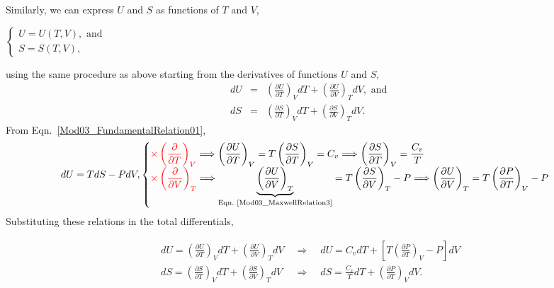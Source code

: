 \documentclass[12pts,a4paper,amsmath,amssymb,floatfix]{article}%
\newcommand{\frc}{\displaystyle\frac}
\newcommand{\red}{\textcolor{red}}
\newcommand{\Partial}[3][error]{\left(\frc{\partial #1}{\partial #2}\right)_{#3}}
\begin{document}
Similarly, we can express $U$ and $S$ as functions of $T$ and $V$,
    \begin{center}
       $\begin{cases}
           U = U(T,V), \text{ and } \\
           S = S(T,V),
        \end{cases}$
    \end{center} 
using the same procedure as above starting from the derivatives of functions $U$ and $S$,
    \begin{eqnarray}
        dU &=& \Partial[U]{T}{V}dT + \Partial[U]{V}{T}dV, \text{ and } \nonumber \\
        dS &=& \Partial[S]{T}{V}dT + \Partial[S]{V}{T}dV. \nonumber
    \end{eqnarray} 
From Eqn.~\ref{Mod03_FundamentalRelation01}, 
    \begin{displaymath}
        dU = TdS - PdV,
        \begin{cases}
            \red{\times\Partial[]{T}{V}} \Longrightarrow \Partial[U]{T}{V} = T\Partial[S]{T}{V} = C_{v} \Longrightarrow  \Partial[S]{T}{V} = \frc{C_{v}}{T}\\
            \red{\times\Partial[]{V}{T}} \Longrightarrow \underbrace{\Partial[U]{V}{T}}_{\text{Eqn.~\ref{Mod03_MaxwellRelation3}}} = T\Partial[S]{V}{T} - P \Longrightarrow \Partial[U]{V}{T} = T\Partial[P]{T}{V}-P   \\
        \end{cases}
    \end{displaymath}
Substituting these relations in the total differentials,
    \begin{shaded}
       \begin{subequations}
          \begin{eqnarray}
             dU = \Partial[U]{T}{V}dT + \Partial[U]{V}{T}dV \;\;&\Longrightarrow&\;\; dU = C_{v}dT + \left[T\Partial[P]{T}{V}-P\right]dV\label{Mod03_DerivedIntEnergyRelation1} \\
             dS = \Partial[S]{T}{V}dT + \Partial[S]{V}{T}dV \;\;&\Longrightarrow&\;\; dS = \frc{C_{v}}{T}dT + \Partial[P]{T}{V}dV.\label{Mod03_DerivedEntropyRelations3}
          \end{eqnarray} 
       \end{subequations}
    \end{shaded}
\end{document}
